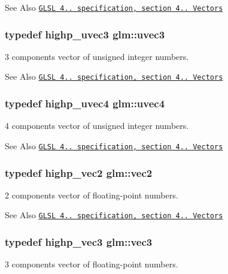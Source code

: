 \begin{DoxySeeAlso}{See Also}
\href{http://www.opengl.org/registry/doc/GLSLangSpec.4.20.8.pdf}{\tt G\-L\-S\-L 4.. specification, section 4.. Vectors} 
\end{DoxySeeAlso}
\hypertarget{group__core__types_gac4ba593917841b859ba1683b8b52b8fa}{
\subsubsection[{uvec3}]{\setlength{\rightskip}{0pt plus 5cm}typedef highp\-\_\-uvec3 {\bf glm\-::uvec3}}}\label{group__core__types_gac4ba593917841b859ba1683b8b52b8fa}
3 components vector of unsigned integer numbers.

\begin{DoxySeeAlso}{See Also}
\href{http://www.opengl.org/registry/doc/GLSLangSpec.4.20.8.pdf}{\tt G\-L\-S\-L 4.. specification, section 4.. Vectors} 
\end{DoxySeeAlso}
\hypertarget{group__core__types_ga1c426d19627b32b14f0089f7f4ba7b1d}{
\subsubsection[{uvec4}]{\setlength{\rightskip}{0pt plus 5cm}typedef highp\-\_\-uvec4 {\bf glm\-::uvec4}}}\label{group__core__types_ga1c426d19627b32b14f0089f7f4ba7b1d}
4 components vector of unsigned integer numbers.

\begin{DoxySeeAlso}{See Also}
\href{http://www.opengl.org/registry/doc/GLSLangSpec.4.20.8.pdf}{\tt G\-L\-S\-L 4.. specification, section 4.. Vectors} 
\end{DoxySeeAlso}
\hypertarget{group__core__types_gaa1618f51db67eaa145db101d8c8431d8}{
\subsubsection[{vec2}]{\setlength{\rightskip}{0pt plus 5cm}typedef highp\-\_\-vec2 {\bf glm\-::vec2}}}\label{group__core__types_gaa1618f51db67eaa145db101d8c8431d8}
2 components vector of floating-\/point numbers.

\begin{DoxySeeAlso}{See Also}
\href{http://www.opengl.org/registry/doc/GLSLangSpec.4.20.8.pdf}{\tt G\-L\-S\-L 4.. specification, section 4.. Vectors} 
\end{DoxySeeAlso}
\hypertarget{group__core__types_ga1c47e8b3386109bc992b6c48e91b0be7}{
\subsubsection[{vec3}]{\setlength{\rightskip}{0pt plus 5cm}typedef highp\-\_\-vec3 {\bf glm\-::vec3}}}\label{group__core__types_ga1c47e8b3386109bc992b6c48e91b0be7}
3 components vector of floating-\/point numbers.

